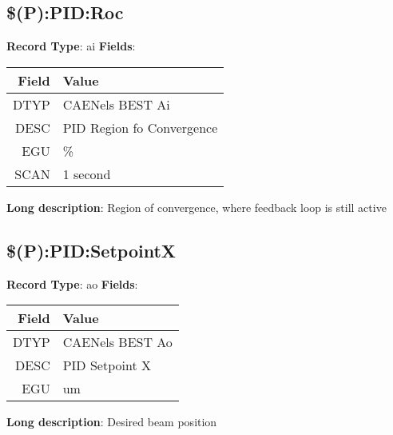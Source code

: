 \subsection{\$(P):PID:Roc}
\textbf{Record Type}: ai \newline \newline 
\textbf{Fields}: \newline 
\begin{tabularx}{0.7\linewidth}{|r|X|}
\hline Field & Value \\
\hline
\hline
DTYP & CAENels BEST Ai\\
\hline
DESC & PID Region fo Convergence\\
\hline
EGU & \%\\
\hline
SCAN & 1 second\\
\hline
\end{tabularx}
\newline \newline \newline
\textbf{Long description}: \newline 
 Region of convergence, where feedback loop is still active
\newline \newline


\subsection{\$(P):PID:SetpointX}
\textbf{Record Type}: ao \newline \newline 
\textbf{Fields}: \newline 
\begin{tabularx}{0.7\linewidth}{|r|X|}
\hline Field & Value \\
\hline
\hline
DTYP & CAENels BEST Ao\\
\hline
DESC & PID Setpoint X\\
\hline
EGU & um\\
\hline
\end{tabularx}
\newline \newline \newline
\textbf{Long description}: \newline 
 Desired beam position
\newline \newline


